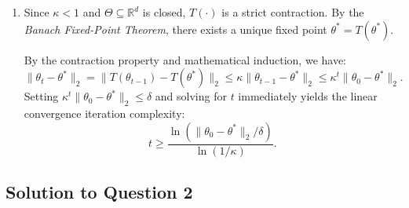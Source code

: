 \documentclass[../../../main.tex]{subfiles}
\begin{document}
\begin{msbproblem}
\begin{answerkey}
\begin{enumerate}
    \item Since $\kappa < 1$ and $\Theta \subseteq \mathbb{R}^d$ is closed, $T(\cdot)$ is a strict contraction. By the \emph{Banach Fixed-Point Theorem}, there exists a unique fixed point $\theta^* = T(\theta^*)$. 

By the contraction property and mathematical induction, we have:
\[
\|\theta_t - \theta^*\|_2 = \|T(\theta_{t-1}) - T(\theta^*)\|_2 \le \kappa \|\theta_{t-1} - \theta^*\|_2 \le \kappa^t \|\theta_0 - \theta^*\|_2.
\]
Setting $\kappa^t \|\theta_0 - \theta^*\|_2 \le \delta$ and solving for $t$ immediately yields the linear convergence iteration complexity:
\[
t \ge \frac{\ln\left(\|\theta_0 - \theta^*\|_2 / \delta\right)}{\ln(1/\kappa)}.
\]
\end{enumerate}


\subsection*{Solution to Question 2}


\end{answerkey}
\end{msbproblem}
\end{document}
